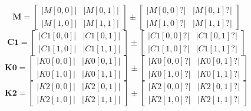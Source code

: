 \documentclass[landscape]{article}
\begin{document}
\begin{equation}
\mathbf{M}=
\left[
\begin{array}{rr}
    |M[0, 0]| & |M[0, 1]|\\
    |M[1, 0]| & |M[1, 1]|
\end{array}
\right]
\pm
\left[
\begin{array}{rr}
    |M[0, 0]?| & |M[0, 1]?|\\
    |M[1, 0]?| & |M[1, 1]?|
\end{array}
\right]
\label{eq:M}
\end{equation}
\begin{equation}
\mathbf{C1}=
\left[
\begin{array}{rr}
    |C1[0, 0]| & |C1[0, 1]|\\
    |C1[1, 0]| & |C1[1, 1]|
\end{array}
\right]
\pm
\left[
\begin{array}{rr}
    |C1[0, 0]?| & |C1[0, 1]?|\\
    |C1[1, 0]?| & |C1[1, 1]?|
\end{array}
\right]
\label{eq:C1}
\end{equation}
\begin{equation}
\mathbf{K0}=
\left[
\begin{array}{rr}
    |K0[0, 0]| & |K0[0, 1]|\\
    |K0[1, 0]| & |K0[1, 1]|
\end{array}
\right]
\pm
\left[
\begin{array}{rr}
    |K0[0, 0]?| & |K0[0, 1]?|\\
    |K0[1, 0]?| & |K0[1, 1]?|
\end{array}
\right]
\label{eq:K0}
\end{equation}
\begin{equation}
\mathbf{K2}=
\left[
\begin{array}{rr}
    |K2[0, 0]| & |K2[0, 1]|\\
    |K2[1, 0]| & |K2[1, 1]|
\end{array}
\right]
\pm
\left[
\begin{array}{rr}
    |K2[0, 0]?| & |K2[0, 1]?|\\
    |K2[1, 0]?| & |K2[1, 1]?|
\end{array}
\right]
\label{eq:K2}
\end{equation}
\end{document}
